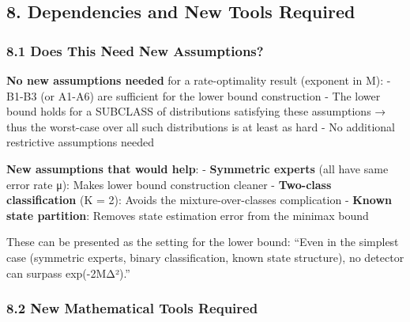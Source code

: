 \documentclass[
  12pt,
]{ctexart}
\begin{document}
\subsection{8. Dependencies and New Tools
Required}\label{dependencies-and-new-tools-required}

\subsubsection{8.1 Does This Need New
Assumptions?}\label{does-this-need-new-assumptions}

\textbf{No new assumptions needed} for a rate-optimality result
(exponent in M): - B1-B3 (or A1-A6) are sufficient for the lower bound
construction - The lower bound holds for a SUBCLASS of distributions
satisfying these assumptions → thus the worst-case over all such
distributions is at least as hard - No additional restrictive
assumptions needed

\textbf{New assumptions that would help}: - \textbf{Symmetric experts}
(all have same error rate μ): Makes lower bound construction cleaner -
\textbf{Two-class classification} (K = 2): Avoids the
mixture-over-classes complication - \textbf{Known state partition}:
Removes state estimation error from the minimax bound

These can be presented as the setting for the lower bound: ``Even in the
simplest case (symmetric experts, binary classification, known state
structure), no detector can surpass exp(-2MΔ²).''

\subsubsection{8.2 New Mathematical Tools
Required}\label{new-mathematical-tools-required}
\end{document}
